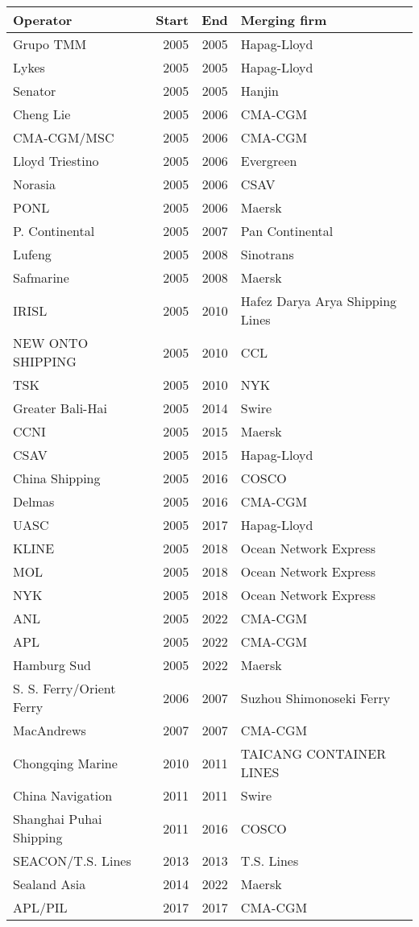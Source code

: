 
\begin{tabular}[t]{lrrl}
\toprule
Operator & Start & End & Merging firm\\
\midrule
Grupo TMM & 2005 & 2005 & Hapag-Lloyd\\
Lykes & 2005 & 2005 & Hapag-Lloyd\\
Senator & 2005 & 2005 & Hanjin\\
Cheng Lie & 2005 & 2006 & CMA-CGM\\
CMA-CGM/MSC & 2005 & 2006 & CMA-CGM\\
Lloyd Triestino & 2005 & 2006 & Evergreen\\
Norasia & 2005 & 2006 & CSAV\\
PONL & 2005 & 2006 & Maersk\\
P. Continental & 2005 & 2007 & Pan Continental\\
Lufeng & 2005 & 2008 & Sinotrans\\
Safmarine & 2005 & 2008 & Maersk\\
IRISL & 2005 & 2010 & Hafez Darya Arya Shipping Lines\\
NEW ONTO SHIPPING & 2005 & 2010 & CCL\\
TSK & 2005 & 2010 & NYK\\
Greater Bali-Hai & 2005 & 2014 & Swire\\
CCNI & 2005 & 2015 & Maersk\\
CSAV & 2005 & 2015 & Hapag-Lloyd\\
China Shipping & 2005 & 2016 & COSCO\\
Delmas & 2005 & 2016 & CMA-CGM\\
UASC & 2005 & 2017 & Hapag-Lloyd\\
KLINE & 2005 & 2018 & Ocean Network Express\\
MOL & 2005 & 2018 & Ocean Network Express\\
NYK & 2005 & 2018 & Ocean Network Express\\
ANL & 2005 & 2022 & CMA-CGM\\
APL & 2005 & 2022 & CMA-CGM\\
Hamburg Sud & 2005 & 2022 & Maersk\\
S. S. Ferry/Orient Ferry & 2006 & 2007 & Suzhou Shimonoseki Ferry\\
MacAndrews & 2007 & 2007 & CMA-CGM\\
Chongqing Marine & 2010 & 2011 & TAICANG CONTAINER LINES\\
China Navigation & 2011 & 2011 & Swire\\
Shanghai Puhai Shipping & 2011 & 2016 & COSCO\\
SEACON/T.S. Lines & 2013 & 2013 & T.S. Lines\\
Sealand Asia & 2014 & 2022 & Maersk\\
APL/PIL & 2017 & 2017 & CMA-CGM\\
\bottomrule
\end{tabular}
